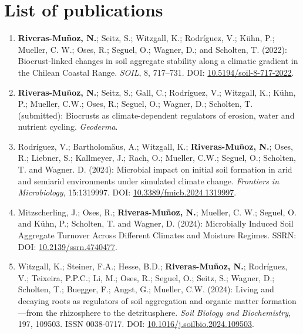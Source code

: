 \chapter*{List of publications}

\begin{enumerate}

\item \textbf{Riveras-Muñoz, N.}; Seitz, S.; Witzgall, K.; Rodríguez, V.; Kühn, P.; Mueller, C. W.; Oses, R.; Seguel, O.; Wagner, D.; and Scholten, T. (2022): Biocrust-linked changes in soil aggregate stability along a climatic gradient in the Chilean Coastal Range. \textit{SOIL}, 8, 717--731. DOI: \href{https://doi.org/10.5194/soil-8-717-2022}{10.5194/soil-8-717-2022}.

\item \textbf{Riveras-Muñoz, N.}; Seitz, S.; Gall, C.; Rodríguez, V.; Witzgall, K.; Kühn, P.; Mueller, C.W.; Oses, R.; Seguel, O.; Wagner, D.; Scholten, T. (submitted): Biocrusts as climate-dependent regulators of erosion, water and nutrient cycling. \textit{Geoderma}.

\item Rodríguez, V.; Bartholomäus, A.; Witzgall, K.; \textbf{Riveras-Muñoz, N.}; Oses, R.; Liebner, S.; Kallmeyer, J.; Rach, O.; Mueller, C.W.; Seguel, O.; Scholten, T. and Wagner. D. (2024): Microbial impact on initial soil formation in arid and semiarid environments under simulated climate change. \textit{Frontiers in Microbiology}, 15:1319997. DOI: \href{https://doi.org/10.3389/fmicb.2024.1319997}{10.3389/fmicb.2024.1319997}.

\item Mitzscherling, J.; Oses, R.; \textbf{Riveras-Muñoz, N.}; Mueller, C. W.; Seguel, O. and Kühn, P.; Scholten, T. and Wagner, D. (2024): Microbially Induced Soil Aggregate Turnover Across Different Climates and Moisture Regimes. SSRN: DOI: \href{https://doi.org/10.2139/ssrn.4740477}{10.2139/ssrn.4740477}.

\item Witzgall, K.; Steiner, F.A.; Hesse, B.D.; \textbf{Riveras-Muñoz, N.}; Rodríguez, V.; Teixeira, P.P.C.; Li, M.; Oses, R.; Seguel, O.; Seitz, S.; Wagner, D.; Scholten, T.; Buegger, F.; Angst, G.; Mueller, C.W. (2024): Living and decaying roots as regulators of soil aggregation and organic matter formation---from the rhizosphere to the detritusphere. \textit{Soil Biology and Biochemistry}, 197, 109503. ISSN 0038-0717. DOI: \href{https://doi.org/10.1016/j.soilbio.2024.109503}{10.1016/j.soilbio.2024.109503}.

\end{enumerate}

